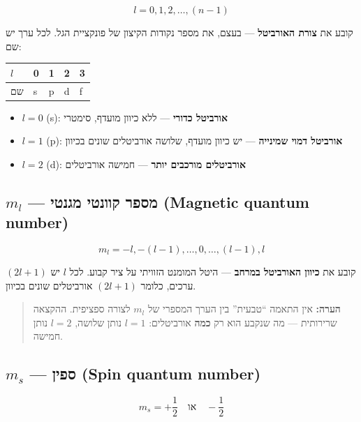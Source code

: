 \documentclass[
  hebrew,
  letterpaper,
  DIV=11,
  numbers=noendperiod]{scrreprt}
\newcounter{none} %
\providecommand{\tightlist}{%
  \setlength{\itemsep}{0pt}\setlength{\parskip}{0pt}}
\begin{document}
\[l = 0, 1, 2, \ldots, (n-1)\]

קובע את \textbf{צורת האורביטל} --- בעצם, את מספר נקודות הקיצון של
פונקציית הגל. לכל ערך יש שם:

{\def\LTcaptype{none} %
\begin{longtable}[]{@{}lllll@{}}
\toprule\noalign{}
\(l\) & 0 & 1 & 2 & 3 \\
\midrule\noalign{}
\endhead
\bottomrule\noalign{}
\endlastfoot
שם & s & p & d & f \\
\end{longtable}
}

\begin{itemize}
\tightlist
\item
  \(l=0\) (s): \textbf{אורביטל כדורי} --- ללא כיוון מועדף, סימטרי
\item
  \(l=1\) (p): \textbf{אורביטל דמוי שמינייה} --- יש כיוון מועדף, שלושה
  אורביטלים שונים בכיוון
\item
  \(l=2\) (d): \textbf{אורביטלים מורכבים יותר} --- חמישה אורביטלים
\end{itemize}

\subsection{\texorpdfstring{\(m_l\) --- מספר קוונטי מגנטי (Magnetic
quantum
number)}{m\_l --- מספר קוונטי מגנטי (Magnetic quantum number)}}\label{m_l-ux5deux5e1ux5e4ux5e8-ux5e7ux5d5ux5d5ux5e0ux5d8ux5d9-ux5deux5d2ux5e0ux5d8ux5d9-magnetic-quantum-number}

\[m_l = -l, -(l-1), \ldots, 0, \ldots, (l-1), l\]

קובע את \textbf{כיוון האורביטל במרחב} --- היטל המומנט הזוויתי על ציר
קבוע. לכל \(l\) יש \((2l+1)\) ערכים, כלומר \((2l+1)\) אורביטלים שונים
בכיוון.

\begin{quote}
\textbf{הערה:} אין התאמה ``טבעית'' בין הערך המספרי של \(m_l\) לצורה
ספציפית. ההקצאה שרירותית --- מה שנקבע הוא רק \textbf{כמה} אורביטלים:
\(l=1\) נותן שלושה, \(l=2\) נותן חמישה.
\end{quote}

\subsection{\texorpdfstring{\(m_s\) --- ספין (Spin quantum
number)}{m\_s --- ספין (Spin quantum number)}}\label{m_s-ux5e1ux5e4ux5d9ux5df-spin-quantum-number}

\[m_s = +\frac{1}{2} \quad \text{או} \quad -\frac{1}{2}\]
\end{document}
